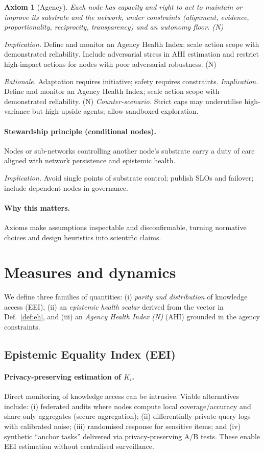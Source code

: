 \documentclass[12pt]{article}
\newtheorem{axiom}{Axiom}
\begin{document}
\begin{axiom}[Agency] Each node has capacity and right to act to maintain or improve its substrate and the network, under constraints (alignment, evidence, proportionality, reciprocity, transparency) and an autonomy floor. (N)

\end{axiom}
\emph{Implication.} Define and monitor an Agency Health Index; scale action scope with demonstrated reliability. Include adversarial stress in AHI estimation and restrict high-impact actions for nodes with poor adversarial robustness. (N)

\emph{Rationale.} Adaptation requires initiative; safety requires constraints. 
\emph{Implication.} Define and monitor an Agency Health Index; scale action scope with demonstrated reliability. (N)
\emph{Counter-scenario.} Strict caps may underutilise high-variance but high-upside agents; allow sandboxed exploration.

\paragraph{Stewardship principle (conditional nodes).} Nodes or sub-networks controlling another node's substrate carry a duty of care aligned with network persistence and epistemic health.

\emph{Implication.} Avoid single points of substrate control; publish SLOs and failover; include dependent nodes in governance.

\paragraph{Why this matters.} Axioms make assumptions inspectable and disconfirmable, turning normative choices and design heuristics into scientific claims.
\section{Measures and dynamics}
We define three families of quantities: (i) \emph{parity and distribution} of knowledge access (EEI), (ii) an \emph{epistemic health scalar} derived from the vector in Def.~\ref{def:eh}, and (iii) an \emph{Agency Health Index (N)} (AHI) grounded in the agency constraints.

\subsection{Epistemic Equality Index (EEI)}
\paragraph{Privacy-preserving estimation of $K_i$.} Direct monitoring of knowledge access can be intrusive. Viable alternatives include: (i) federated audits where nodes compute local coverage/accuracy and share only aggregates (secure aggregation); (ii) differentially private query logs with calibrated noise; (iii) randomised response for sensitive items; and (iv) synthetic ``anchor tasks'' delivered via privacy-preserving A/B tests. These enable EEI estimation without centralised surveillance.
\end{document}
